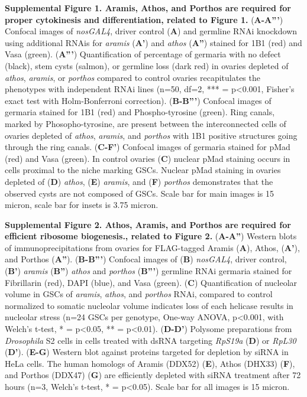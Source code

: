 \documentclass[12pt,twoside]{reedthesis}
\begin{document}
\textbf{Supplemental Figure 1. Aramis, Athos, and Porthos are required for
proper cytokinesis and differentiation, related to Figure 1.}
(\textbf{A-A'''}) Confocal images of \emph{nosGAL4}, driver control (\textbf{A}) and
germline RNAi knockdown using additional RNAis for \emph{aramis} (\textbf{A'}) and
\emph{athos} (\textbf{A''}) stained for 1B1 (red) and Vasa (green). (\textbf{A'''})
Quantification of percentage of germaria with no defect (black), stem
cysts (salmon), or germline loss (dark red) in ovaries depleted of
\emph{athos}, \emph{aramis}, or \emph{porthos} compared to control ovaries
recapitulates the phenotypes with independent RNAi lines (n=50, df=2,
*** = p\textless0.001, Fisher's exact test with Holm-Bonferroni correction).
(\textbf{B-B'''}) Confocal images of germaria stained for 1B1 (red) and
Phospho-tyrosine (green). Ring canals, marked by Phosopho-tyrosine, are
present between the interconnected cells of ovaries depleted of \emph{athos},
\emph{aramis}, and \emph{porthos} with 1B1 positive structures going through the
ring canals. (\textbf{C-F'}) Confocal images of germaria stained for pMad
(red) and Vasa (green). In control ovaries (\textbf{C}) nuclear pMad staining
occurs in cells proximal to the niche marking GSCs. Nuclear pMad
staining in ovaries depleted of (\textbf{D}) \emph{athos}, (\textbf{E}) \emph{aramis}, and
(\textbf{F}) \emph{porthos} demonstrates that the observed cysts are not composed
of GSCs. Scale bar for main images is 15 micron, scale bar for insets is
3.75 micron.

\textbf{Supplemental Figure 2. Athos, Aramis, and Porthos are required for
efficient ribosome biogenesis., related to Figure 2.} (\textbf{A-A''})
Western blots of immunoprecipitations from ovaries for FLAG-tagged
Aramis (\textbf{A}), Athos, (\textbf{A'}), and Porthos (\textbf{A''}). (\textbf{B-B'''})
Confocal images of (\textbf{B}) \emph{nosGAL4}, driver control, (\textbf{B'}) \emph{aramis}
(\textbf{B''}) \emph{athos} and \emph{porthos} (\textbf{B'''}) germline RNAi germaria
stained for Fibrillarin (red), DAPI (blue), and Vasa (green). (\textbf{C})
Quantification of nucleolar volume in GSCs of \emph{aramis}, \emph{athos}, and
\emph{porthos} RNAi, compared to control normalized to somatic nucleolar
volume indicates loss of each helicase results in nucleolar stress (n=24
GSCs per genotype, One-way ANOVA, p\textless0.001, with Welch's t-test, * =
p\textless0.05, ** = p\textless0.01). (\textbf{D-D'}) Polysome preparations from
\emph{Drosophila} S2 cells in cells treated with dsRNA targeting \emph{RpS19a}
(\textbf{D}) or \emph{RpL30} (\textbf{D'}). (\textbf{E-G}) Western blot against proteins
targeted for depletion by siRNA in HeLa cells. The human homologs of
Aramis (DDX52) (\textbf{E}), Athos (DHX33) (\textbf{F}), and Porthos (DDX47)
(\textbf{G}) are efficiently depleted with siRNA treatment after 72 hours
(n=3, Welch's t-test, * = p\textless0.05). Scale bar for all images is 15
micron.
\end{document}
